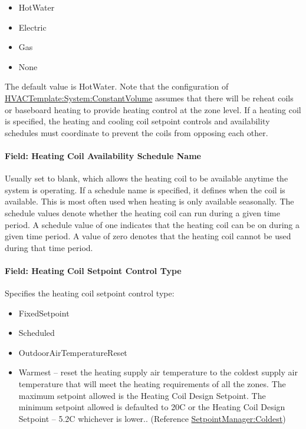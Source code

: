 \begin{itemize}
\item
  HotWater
\item
  Electric
\item
  Gas
\item
  None
\end{itemize}

The default value is HotWater. Note that the configuration of \hyperref[hvactemplatesystemconstantvolume]{HVACTemplate:System:ConstantVolume} assumes that there will be reheat coils or baseboard heating to provide heating control at the zone level. If a heating coil is specified, the heating and cooling coil setpoint controls and availability schedules must coordinate to prevent the coils from opposing each other.

\paragraph{Field: Heating Coil Availability Schedule Name}\label{field-heating-coil-availability-schedule-name-7}

Usually set to blank, which allows the heating coil to be available anytime the system is operating. If a schedule name is specified, it defines when the coil is available. This is most often used when heating is only available seasonally. The schedule values denote whether the heating coil can run during a given time period. A schedule value of one indicates that the heating coil can be on during a given time period. A value of zero denotes that the heating coil cannot be used during that time period.

\paragraph{Field: Heating Coil Setpoint Control Type}\label{field-heating-coil-setpoint-control-type-1}

Specifies the heating coil setpoint control type:

\begin{itemize}
\item
  FixedSetpoint
\item
  Scheduled
\item
  OutdoorAirTemperatureReset
\item
  Warmest -- reset the heating supply air temperature to the coldest supply air temperature that will meet the heating requirements of all the zones. The maximum setpoint allowed is the Heating Coil Design Setpoint. The minimum setpoint allowed is defaulted to 20C or the Heating Coil Design Setpoint -- 5.2C whichever is lower.. (Reference \hyperref[setpointmanagercoldest]{SetpointManager:Coldest})
\end{itemize}

